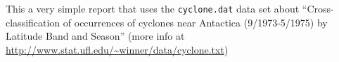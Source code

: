 \noindent
This a very simple report that uses the \texttt{cyclone.dat} data set about ``Cross-classification of occurrences of cyclones near Antactica (9/1973-5/1975) by Latitude Band and Season'' (more info at \url{http://www.stat.ufl.edu/~winner/data/cyclone.txt})
